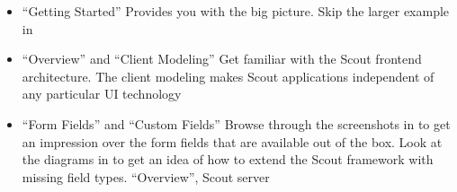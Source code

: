 \documentclass[a4paper,10pt,twoside]{book}
\begin{document}
\begin{itemize}
  \item {} ``Getting Started'' 
      Provides you with the big picture. Skip the larger example in 
  \item {} ``Overview'' and  ``Client Modeling''
      Get familiar with the Scout frontend architecture. 
	  The client modeling makes Scout applications independent of any particular UI technology
  \item {} ``Form Fields'' and  ``Custom Fields''
      Browse through the screenshots in  to get an impression over the form fields that are available out of the box. 
	  Look at the diagrams in  to get an idea of how to extend the Scout framework with missing field types.
   ``Overview'',  Scout server
\end{itemize}
\end{document}
